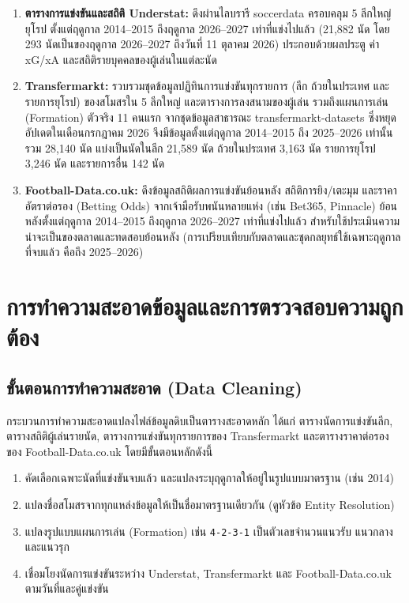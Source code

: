 \begin{enumerate}[label=\arabic*)]
    \item \textbf{ตารางการแข่งขันและสถิติ Understat:} ดึงผ่านไลบรารี soccerdata ครอบคลุม 5 ลีกใหญ่ยุโรป ตั้งแต่ฤดูกาล 2014--2015 ถึงฤดูกาล 2026--2027 เท่าที่แข่งไปแล้ว (21,882 นัด โดย 293 นัดเป็นของฤดูกาล 2026--2027 ถึงวันที่ 11 ตุลาคม 2026) ประกอบด้วยผลประตู ค่า xG/xA และสถิติรายบุคคลของผู้เล่นในแต่ละนัด \cite{understat2024}
    \item \textbf{Transfermarkt:} รวบรวมชุดข้อมูลปฏิทินการแข่งขันทุกรายการ (ลีก ถ้วยในประเทศ และรายการยุโรป) ของสโมสรใน 5 ลีกใหญ่ และตารางการลงสนามของผู้เล่น รวมถึงแผนการเล่น (Formation) ตัวจริง 11 คนแรก จากชุดข้อมูลสาธารณะ transfermarkt-datasets ซึ่งหยุดอัปเดตในเดือนกรกฎาคม 2026 จึงมีข้อมูลตั้งแต่ฤดูกาล 2014--2015 ถึง 2025--2026 เท่านั้น รวม 28,140 นัด แบ่งเป็นนัดในลีก 21,589 นัด ถ้วยในประเทศ 3,163 นัด รายการยุโรป 3,246 นัด และรายการอื่น 142 นัด \cite{transfermarkt2024}
    \item \textbf{Football-Data.co.uk:} ดึงข้อมูลสถิติผลการแข่งขันย้อนหลัง สถิติการยิง/เตะมุม และราคาอัตราต่อรอง (Betting Odds) จากเจ้ามือรับพนันหลายแห่ง (เช่น Bet365, Pinnacle) ย้อนหลังตั้งแต่ฤดูกาล 2014--2015 ถึงฤดูกาล 2026--2027 เท่าที่แข่งไปแล้ว สำหรับใช้ประเมินความน่าจะเป็นของตลาดและทดสอบย้อนหลัง (การเปรียบเทียบกับตลาดและชุดกลยุทธ์ใช้เฉพาะฤดูกาลที่จบแล้ว คือถึง 2025--2026) \cite{footballdata}
\end{enumerate}

\section{การทำความสะอาดข้อมูลและการตรวจสอบความถูกต้อง}

\subsection{ขั้นตอนการทำความสะอาด (Data Cleaning)}

กระบวนการทำความสะอาดแปลงไฟล์ข้อมูลดิบเป็นตารางสะอาดหลัก ได้แก่ ตารางนัดการแข่งขันลีก, ตารางสถิติผู้เล่นรายนัด, ตารางการแข่งขันทุกรายการของ Transfermarkt และตารางราคาต่อรองของ Football-Data.co.uk โดยมีขั้นตอนหลักดังนี้

\begin{enumerate}[label=\arabic*)]
    \item คัดเลือกเฉพาะนัดที่แข่งขันจบแล้ว และแปลงระบุฤดูกาลให้อยู่ในรูปแบบมาตรฐาน (เช่น 2014)
    \item แปลงชื่อสโมสรจากทุกแหล่งข้อมูลให้เป็นชื่อมาตรฐานเดียวกัน (ดูหัวข้อ Entity Resolution)
    \item แปลงรูปแบบแผนการเล่น (Formation) เช่น \texttt{4-2-3-1} เป็นตัวเลขจำนวนแนวรับ แนวกลาง และแนวรุก
    \item เชื่อมโยงนัดการแข่งขันระหว่าง Understat, Transfermarkt และ Football-Data.co.uk ตามวันที่และคู่แข่งขัน
\end{enumerate}

